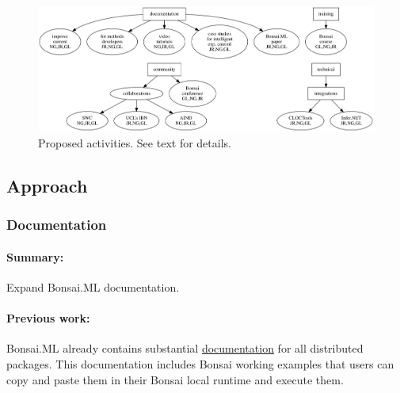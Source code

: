 
\begin{figure}
    \centering
    \includegraphics[width=6in]{activitiesGraphs/activities_larger.png}
    \caption{Proposed activities. See text for details.}
\end{figure}

\subsection*{Approach}

\subsubsection*{Documentation}

\paragraph{Summary:} Expand Bonsai.ML documentation.

\paragraph{Previous work:} Bonsai.ML already contains substantial
\href{https://bonsai-rx.org/machinelearning/index.html}{documentation} for all
distributed packages. This documentation includes Bonsai working examples that
users can copy and paste them in their Bonsai local runtime and execute them.

